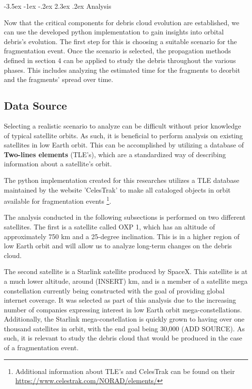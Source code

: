 \documentclass[a4paper, 12pt]{article}
\makeatletter
\renewcommand\section{\clearpage\newpage\@startsection {section}{1}{\z@}%
	{-3.5ex \@plus -1ex \@minus -.2ex}%
	{2.3ex \@plus.2ex}%
	{\normalfont\Large\bfseries}}
\newcommand{\boldindex}[1]{%
	\textbf{#1}\index{#1}%
}
\makeatother
\begin{document}
\section{Analysis}

Now that the critical components for debris cloud evolution are established, we can use the developed python implementation to gain insights into orbital debris's evolution. The first step for this is choosing a suitable scenario for the fragmentation event. Once the scenario is selected, the propagation methods defined in section 4 can be applied to study the debris throughout the various phases. This includes analyzing the estimated time for the fragments to deorbit and the fragments' spread over time.

\subsection{Data Source}
Selecting a realistic scenario to analyze can be difficult without prior knowledge of typical satellite orbits. As such, it is beneficial to perform analysis on existing satellites in low Earth orbit. This can be accomplished by utilizing a database of \boldindex{Two-lines elements} (TLE's), which are a standardized way of describing information about a satellite's orbit.

The python implementation created for this researches utilizes a TLE database maintained by the website 'CelesTrak' to make all cataloged objects in orbit available for fragmentation events \footnote{Additional information about TLE's and CelesTrak can be found on their \href{URL}{https://www.celestrak.com/NORAD/elements/}}.

The analysis conducted in the following subsections is performed on two different satellites. The first is a satellite called OXP 1, which has an altitude of approximately 750 km and a 25-degree inclination. This is in a higher region of low Earth orbit and will allow us to analyze long-term changes on the debris cloud.

The second satellite is a Starlink satellite produced by SpaceX. This satellite is at a much lower altitude, around (INSERT) km, and is a member of a satellite mega constellation currently being constructed with the goal of providing global internet coverage. It was selected as part of this analysis due to the increasing number of companies expressing interest in low Earth orbit mega-constellations. Additionally, the Starlink mega-constellation is quickly grown to having over one thousand satellites in orbit, with the end goal being 30,000 (ADD SOURCE). As such, it is relevant to study the debris cloud that would be produced in the case of a fragmentation event.
\end{document}
